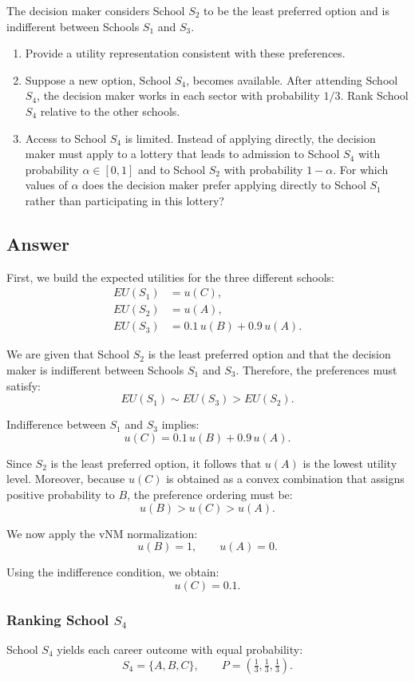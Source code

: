 \documentclass[12pt]{article}
\begin{document}
The decision maker considers School $S_2$ to be the least preferred option and is indifferent between Schools $S_1$ and $S_3$.

\begin{enumerate}
\item Provide a utility representation consistent with these preferences.
\item Suppose a new option, School $S_4$, becomes available. After attending School $S_4$, the decision maker works in each sector with probability $1/3$. Rank School $S_4$ relative to the other schools.
\item Access to School $S_4$ is limited. Instead of applying directly, the decision maker must apply to a lottery that leads to admission to School $S_4$ with probability $\alpha \in [0,1]$ and to School $S_2$ with probability $1-\alpha$. For which values of $\alpha$ does the decision maker prefer applying directly to School $S_1$ rather than participating in this lottery?
\end{enumerate}

\subsection*{Answer}
First, we build the expected utilities for the three different schools:
\[
\begin{aligned}
EU(S_1) &= u(C), \\
EU(S_2) &= u(A), \\
EU(S_3) &= 0.1\,u(B) + 0.9\,u(A).
\end{aligned}
\]

We are given that School $S_2$ is the least preferred option and that the decision maker is indifferent between Schools $S_1$ and $S_3$. Therefore, the preferences must satisfy:
\[
EU(S_1) \sim EU(S_3) > EU(S_2).
\]

Indifference between $S_1$ and $S_3$ implies:
\[
u(C) = 0.1\,u(B) + 0.9\,u(A).
\]

Since $S_2$ is the least preferred option, it follows that $u(A)$ is the lowest utility level. Moreover, because $u(C)$ is obtained as a convex combination that assigns positive probability to $B$, the preference ordering must be:
\[
u(B) > u(C) > u(A).
\]

We now apply the vNM normalization:
\[
u(B) = 1, \qquad u(A) = 0.
\]

Using the indifference condition, we obtain:
\[
u(C) = 0.1.
\]

\subsubsection*{Ranking School $S_4$}
School $S_4$ yields each career outcome with equal probability:
\[
S_4 = \{A,B,C\}, \qquad P = \left(\tfrac{1}{3}, \tfrac{1}{3}, \tfrac{1}{3}\right).
\]
\end{document}
